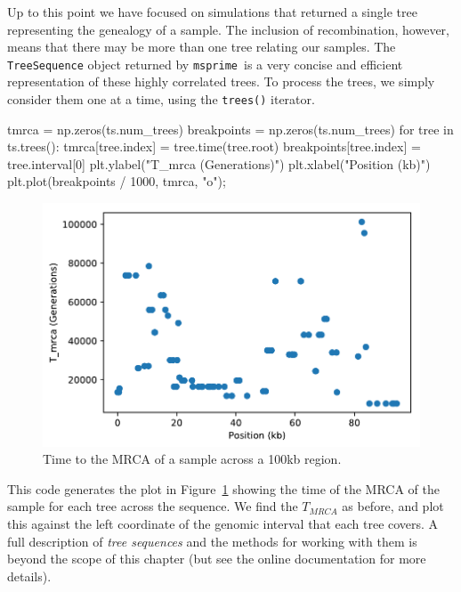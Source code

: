 \documentclass[graybox]{svmult}
\newcommand{\msprime}[0]{\texttt{msprime}}
\begin{document}
Up to this point we have focused on simulations that returned a single
tree representing the genealogy of a sample. The inclusion of
recombination, however, means that there may be more than one tree
relating our samples. The \texttt{TreeSequence} object returned by
\msprime\ is a very concise and efficient representation of these highly
correlated trees. To process the trees, we simply consider
them one at a time, using the \texttt{trees()} iterator.

\begin{pythoncode}
tmrca = np.zeros(ts.num_trees)
breakpoints = np.zeros(ts.num_trees)
for tree in ts.trees():
    tmrca[tree.index] = tree.time(tree.root)
    breakpoints[tree.index] = tree.interval[0]
plt.ylabel("T_mrca (Generations)")
plt.xlabel("Position (kb)")
plt.plot(breakpoints / 1000, tmrca, "o");
\end{pythoncode}

\begin{figure}
\begin{center}
\includegraphics[width=\textwidth]{images/plot_10.pdf}
\end{center}
\caption{\label{fig:tree_tmrcas}Time to the MRCA of
a sample across a 100kb region.}
\end{figure}

This code generates the plot in Figure~\ref{fig:tree_tmrcas} showing the time of the MRCA of the sample for each tree across the
sequence. We find the \(T_{MRCA}\) as before, and plot this against the
left coordinate of the genomic interval that each tree covers. A full description of
\emph{tree sequences} and the methods for working with them is beyond the scope of this chapter (but see the online documentation for more details).
\end{document}
